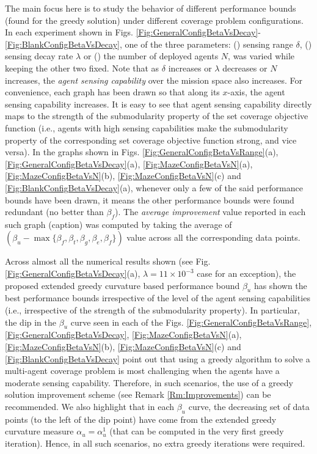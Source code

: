 \documentclass[conference]{IEEEtran}
\begin{document}
The main focus here is to study the behavior of different performance bounds (found for the greedy solution) under different coverage problem configurations. In each experiment shown in Figs. \ref{Fig:GeneralConfigBetaVsDecay}-\ref{Fig:BlankConfigBetaVsDecay}, one of the three parameters: () sensing range $\delta$, () sensing decay rate $\lambda$ or () the number of deployed agents $N$, was varied while keeping the other two fixed. Note that as $\delta$ increases or $\lambda$ decreases or $N$ increases, the \emph{agent sensing capability} over the mission space also increases. For convenience, each graph has been drawn so that along its $x$-axis, the agent sensing capability increases. It is easy to see that agent sensing capability directly maps to the strength of the submodularity property of the set coverage objective function (i.e., agents with high sensing capabilities make the submodularity property of the corresponding set coverage objective function strong, and vice versa). 
In the graphs shown in Figs. \ref{Fig:GeneralConfigBetaVsRange}(a), \ref{Fig:GeneralConfigBetaVsDecay}(a), \ref{Fig:MazeConfigBetaVsN}(a), \ref{Fig:MazeConfigBetaVsN}(b), \ref{Fig:MazeConfigBetaVsN}(c) and \ref{Fig:BlankConfigBetaVsDecay}(a), whenever only a few of the said performance bounds have been drawn, it means the other performance bounds were found redundant (no better than $\beta_f$). The \emph{average improvement} value reported in each such graph (caption) was computed by taking the average of $(\beta_u-\max\{\beta_f,\beta_t,\beta_g,\beta_e,\beta_f\})$ value across all the corresponding data points.



Across almost all the numerical results shown (see Fig. \ref{Fig:GeneralConfigBetaVsDecay}(a), $\lambda=11\times 10^{-3}$ case for an exception), the proposed extended greedy curvature based performance bound $\beta_u$ has shown the best performance bounds irrespective of the level of the agent sensing capabilities (i.e., irrespective of the strength of the submodularity property). In particular, the dip in the $\beta_u$ curve seen in each of the Figs. \ref{Fig:GeneralConfigBetaVsRange}, \ref{Fig:GeneralConfigBetaVsDecay}, \ref{Fig:MazeConfigBetaVsN}(a), \ref{Fig:MazeConfigBetaVsN}(b), \ref{Fig:MazeConfigBetaVsN}(c) and \ref{Fig:BlankConfigBetaVsDecay} point out that using a greedy algorithm to solve a multi-agent coverage problem is most challenging when the agents have a moderate sensing capability. Therefore, in such scenarios, the use of a greedy solution improvement scheme (see Remark \ref{Rm:Improvements}) can be recommended. We also highlight that in each $\beta_u$ curve, the decreasing set of data points (to the left of the dip point) have come from the extended greedy curvature measure $\alpha_u = \alpha^1_u$ (that can be computed in the very first greedy iteration). Hence, in all such scenarios, no extra greedy iterations were required. 
\end{document}
